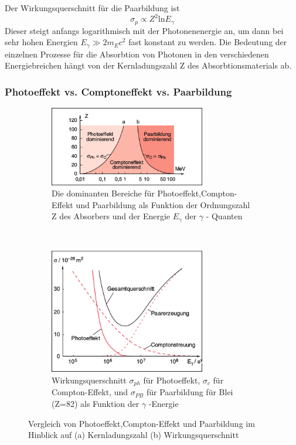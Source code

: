 \documentclass[Ex4_Zusammenfassung.tex]{subfiles}
\begin{document}
 	
Der Wirkungsquerschnitt für die Paarbildung ist
\begin{equation}
\sigma_{p} \propto Z^2 \text{ln} E_{\gamma}
\end{equation}
Dieser steigt anfangs logarithmisch mit der Photonenenergie an, um dann bei sehr hohen Energien $E_{\gamma} \gg 2 m_E c^2$ fast konstant zu werden. \newline
Die Bedeutung der einzelnen Prozesse für die Absorbtion von Photonen in den verschiedenen Energiebreichen hängt von der Kernladungszahl Z des Absorbtionsmaterials ab.\newpage
\subsubsection{Photoeffekt vs. Comptoneffekt vs. Paarbildung}
\begin{figure}[h]

	\begin{subfigure}{\textwidth}
	\includegraphics[width=6.8cm]{FCP_Z.png}
	\caption{Die dominanten Bereiche für Photoeffekt,Compton-Effekt und Paarbildung als Funktion der Ordnungszahl Z des Absorbers und der Energie $ E_{\gamma} $ der $ \gamma $ - Quanten}
	\end{subfigure}
	\\ \newline
	\begin{subfigure}{\textwidth}
	\includegraphics[width=6.8cm]{FCP_sigma.png}
	\caption{Wirkungsquerschnitt $ \sigma_{ph} $ für Photoeffekt, $ \sigma_{c} $ für Compton-Effekt, und $ \sigma_{PB} $ für Paarbildung für Blei (Z=82) als Funktion der $ \gamma $ -Energie}
	\end{subfigure}
	\caption{Vergleich von Photoeffekt,Compton-Effekt und Paarbildung im Hinblick auf (a) Kernladungszahl (b) Wirkungsquerschnitt}

\end{figure}
\end{document}
